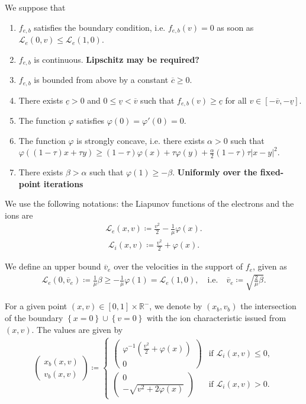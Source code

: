 \documentclass{article}
\numberwithin{equation}{section}
\newcommand{\todo}[1]{{\color{red}\textbf{#1}}}
\newcommand{\vv}[1]{\begin{pmatrix} #1 \end{pmatrix}} %
\newcommand{\ve}{{\overline{v}_e}} %
\newcommand{\domfel}{{\underline{v}}} %
\newcommand{\domfeu}{{\overline{v}}} %
\newcommand{\minfe}{{\underline{c}}} %
\newcommand{\maxfe}{{\overline{c}}} %
\begin{document}
We suppose that 
\begin{enumerate}
\item $f_{e,b}$ satisfies the boundary condition, i.e. $f_{e,b}(v) = 0$ as soon as $\mathcal{L}_e(0,v) \leqslant \mathcal{L}_e(1,0)$.
\item $f_{e,b}$ is continuous. \todo{Lipschitz may be required?}
\item $f_{e,b}$ is bounded from above by a constant $\maxfe \geqslant 0$.
\item There exists $\minfe > 0$ and $0 \leqslant \domfel < \domfeu$ such that $f_{e,b}(v) \geqslant \minfe$ for all $v\in[-\domfeu,-\domfel]$.
\item The function $\varphi$ satisfies $\varphi(0)=\varphi'(0)=0$.
\item The function $\varphi$ is strongly concave, i.e. there exists $\alpha>0$ such that $\varphi((1-\tau) x + \tau y) \geqslant (1-\tau) \varphi(x)+\tau \varphi(y) + \frac{\alpha}{2} (1-\tau)\tau \left|x-y\right|^2$.
\item There exists $\beta > \alpha$ such that $\varphi(1) \geqslant - \beta$. \todo{Uniformly over the fixed-point iterations}
\end{enumerate}

We use the following notations: the Liapunov functions of the electrons and the ions are
\begin{align}\label{eq:def_Le}
	\mathcal{L}_e(x,v) \coloneqq \frac{v^2}{2} - \frac{1}{\mu} \varphi(x).
\end{align}
\begin{align}\label{eq:def_Li}
	\mathcal{L}_i(x,v) \coloneqq \frac{v^2}{2} + \varphi(x).
\end{align}

We define an upper bound $\ve$ over the velocities in the support of $f_e$, given as
\begin{align}\label{eq:def_ve}
	\mathcal{L}_e(0,\ve) \coloneqq \frac{1}{\mu} \beta \geqslant -\frac{1}{\mu}\varphi(1) = \mathcal{L}_e(1,0), \quad\text{i.e.}\quad \ve \coloneqq \sqrt{\frac{2}{\mu}\beta}.
\end{align}

For a given point $(x,v) \in [0,1]\times \mathbb{R}^{-}$, we denote by $(x_b, v_b)$ the intersection of the boundary $\left\{x=0\right\} \cup \left\{v=0\right\}$ with the ion characteristic issued from $(x,v)$. The values are given by
\begin{align}\label{eq:def_xb_vb}
	\vv{x_b(x,v) \\ v_b(x,v)} \coloneqq 
	\begin{cases}
		\vv{\varphi^{-1}\left(\frac{v^2}{2} + \varphi(x)\right) \\ 0} & \text{if } \mathcal{L}_i(x,v) \leqslant 0, \\
		\vv{0 \\ - \sqrt{v^2 + 2\varphi(x)}} & \text{if } \mathcal{L}_i(x,v) > 0.
	\end{cases}
\end{align}
\end{document}
